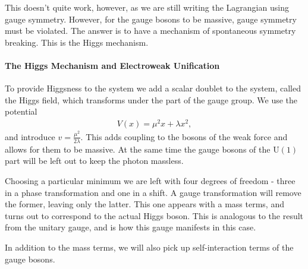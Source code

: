 This doesn't quite work, however, as we are still writing the Lagrangian using gauge symmetry. However, for the gauge bosons to be massive, gauge symmetry must be violated. The answer is to have a mechanism of spontaneous symmetry breaking. This is the Higgs mechanism.

\paragraph{The Higgs Mechanism and Electroweak Unification}
To provide Higgsness to the system we add a scalar doublet to the system, called the Higgs field, which transforms under the  part of the gauge group. We use the potential
\begin{align*}
	V(x) = \mu^{2}x + \lambda x^{2},
\end{align*}
and introduce $v = \frac{\mu^{2}}{2\lambda}$. This adds coupling to the bosons of the weak force and allows for them to be massive. At the same time the gauge bosons of the $\text{U}(1)$ part will be left out to keep the photon massless.

Choosing a particular minimum we are left with four degrees of freedom - three in a phase transformation and one in a shift. A gauge transformation will remove the former, leaving only the latter. This one appears with a mass terms, and turns out to correspond to the actual Higgs boson. This is analogous to the result from the unitary gauge, and is how this gauge manifests in this case.

In addition to the mass terms, we will also pick up self-interaction terms of the gauge bosons.